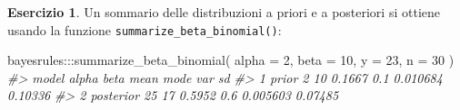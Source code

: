 \documentclass[
  11pt,
]{krantz}
\makeatletter
\newenvironment{Shaded}{\begin{snugshade}}{\end{snugshade}}
\newcommand{\AttributeTok}[1]{\textcolor[rgb]{0.61,0.61,0.61}{#1}}
\newcommand{\CommentTok}[1]{\textcolor[rgb]{0.37,0.37,0.37}{\textit{#1}}}
\newcommand{\DecValTok}[1]{\textcolor[rgb]{0.06,0.06,0.06}{#1}}
\newcommand{\FunctionTok}[1]{\textcolor[rgb]{0,0,0}{#1}}
\newcommand{\NormalTok}[1]{#1}
\newcommand{\SpecialCharTok}[1]{\textcolor[rgb]{0,0,0}{#1}}
\newenvironment{kframe}{%
\medskip{}
\setlength{\fboxsep}{.8em}
 \def\at@end@of@kframe{}%
 \ifinner\ifhmode%
  \def\at@end@of@kframe{\end{minipage}}%
  \begin{minipage}{\columnwidth}%
 \fi\fi%
 \def\FrameCommand##1{\hskip\@totalleftmargin \hskip-\fboxsep
 \colorbox{shadecolor}{##1}\hskip-\fboxsep
     \hskip-\linewidth \hskip-\@totalleftmargin \hskip\columnwidth}%
 \MakeFramed {\advance\hsize-\width
   \@totalleftmargin\z@ \linewidth\hsize
   \@setminipage}}%
 {\par\unskip\endMakeFramed%
 \at@end@of@kframe}
\renewenvironment{Shaded}{\begin{kframe}}{\end{kframe}}
\theoremstyle{definition}
\theoremstyle{definition}
\theoremstyle{definition}
\newtheorem{exercise}{Esercizio}[chapter]
\theoremstyle{definition}
\theoremstyle{remark}
\makeatother
\begin{document}
\begin{exercise}
Un sommario delle distribuzioni a priori e a posteriori si ottiene usando la funzione \texttt{summarize\_beta\_binomial()}:

\begin{Shaded}
\begin{Highlighting}[]
\NormalTok{bayesrules}\SpecialCharTok{:::}\FunctionTok{summarize\_beta\_binomial}\NormalTok{(}
  \AttributeTok{alpha =} \DecValTok{2}\NormalTok{, }\AttributeTok{beta =} \DecValTok{10}\NormalTok{, }\AttributeTok{y =} \DecValTok{23}\NormalTok{, }\AttributeTok{n =} \DecValTok{30}
\NormalTok{)}
\CommentTok{\#\textgreater{}       model alpha beta   mean mode      var      sd}
\CommentTok{\#\textgreater{} 1     prior     2   10 0.1667  0.1 0.010684 0.10336}
\CommentTok{\#\textgreater{} 2 posterior    25   17 0.5952  0.6 0.005603 0.07485}
\end{Highlighting}
\end{Shaded}

\end{exercise}
\end{document}
